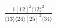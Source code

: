 \documentclass[varwidth, border=5pt]{standalone}
\begin{document}
\begin{my}
$\begin{gathered}
\scriptscriptstyle\frac{1[12]^2⟨12⟩^2}{⟨13⟩⟨24⟩[25]^2⟨34⟩}
\end{gathered}$
\end{my}
\end{document}
